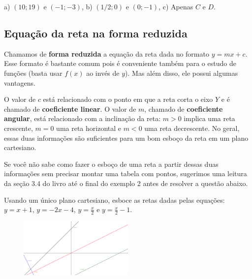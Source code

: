 \documentclass[main.tex]{subfiles}
\begin{document}
\begin{gabarito}
	\begin{gabaritoQuestao}
		a) $(10;19)$ e $(-1;-3)$, b) $(1/2;0)$ e $(0;-1)$, c) Apenas $C$ e $D$.
	\end{gabaritoQuestao}
\end{gabarito}

\subsection*{Equação da reta na forma reduzida}

Chamamos de \textbf{forma reduzida} a equação da reta dada no formato $y=mx+c$. Esse formato é bastante comum pois é conveniente também para o estudo de funções (basta usar $f(x)$ ao invés de $y$). Mas além disso, ele possui algumas vantagens.

O valor de $c$ está relacionado com o ponto em que a reta corta o eixo $Y$ e é chamado de \textbf{coeficiente linear}. O valor de $m$, chamado de \textbf{coeficiente angular}, está relacionado com a inclinação da reta: $m>0$ implica uma reta crescente, $m=0$ uma reta horizontal e $m<0$ uma reta decrescente. No geral, essas duas informações são suficientes para um bom esboço da reta em um plano cartesiano.

Se você não sabe como fazer o esboço de uma reta a partir dessas duas informações sem precisar montar uma tabela com pontos, sugerimos uma leitura da seção 3.4 do livro  até o final do exemplo 2 antes de resolver a questão abaixo.

\begin{questao}
Usando um único plano cartesiano, esboce as retas dadas pelas equações: $y=x+1$, $y=-2x-4$, $y=\frac{x}{2}$ e $y=\frac{x}{2}-1$.
\end{questao}


\begin{gabarito}
	\begin{gabaritoQuestao}
		\begin{figure}[h]
\centering
\includegraphics[width=0.5\textwidth]{./img/c6g4.png}
\end{figure}
	\end{gabaritoQuestao}
\end{gabarito}
\end{document}
